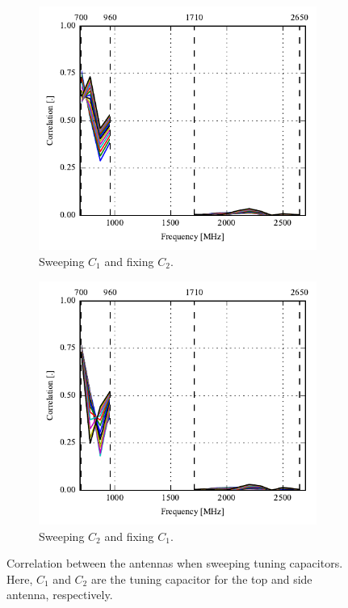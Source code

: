 \begin{figure}[htbp]
    \centering
    \begin{subfigure}{0.49\linewidth}
        \includegraphics{img/tech_sol/monopole/free_space/s11_corr}
        \caption{Sweeping $C_1$ and fixing $C_2$.}
    \end{subfigure}
    \hfill
    \begin{subfigure}{0.49\linewidth}
        \includegraphics{img/tech_sol/monopole/free_space/s22_corr}
        \caption{Sweeping $C_2$ and fixing $C_1$.}
    \end{subfigure}
    \caption{Correlation between the antennas when sweeping tuning capacitors. Here, $C_1$ and $C_2$ are the tuning capacitor for the top and side antenna, respectively.}
    \label{fig:corr_sol1}
\end{figure}

